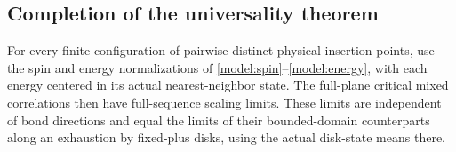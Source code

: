 \subsection{Completion of the universality theorem}

\begin{lemma}
\label{src:reference-plane}
For every finite configuration of pairwise distinct physical insertion
points, use the spin and energy normalizations of
\eqref{model:spin}--\eqref{model:energy}, with each energy centered in its
actual nearest-neighbor state. The full-plane critical mixed correlations
then have full-sequence scaling limits. These limits are independent of
bond directions and equal the limits of their bounded-domain counterparts
along an exhaustion by fixed-plus disks, using the actual disk-state means
there.
\end{lemma}

